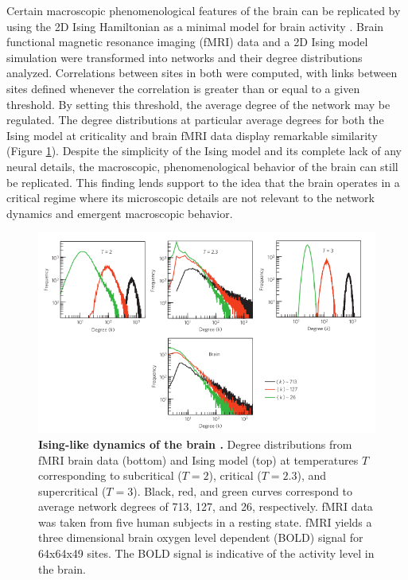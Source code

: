 \documentclass[12pt]{article}
\begin{document}
Certain macroscopic phenomenological features of the brain can be replicated by using the 2D Ising Hamiltonian as a minimal model for brain activity \cite{Fraiman2009a}. Brain functional magnetic resonance imaging (fMRI) data and a 2D Ising model simulation were transformed into networks and their degree distributions analyzed. Correlations between sites in both were computed, with links between sites defined whenever the correlation is greater than or equal to a given threshold. By setting this threshold, the average degree of the network may be regulated. The degree distributions at particular average degrees for both the Ising model at criticality and brain fMRI data display remarkable similarity (Figure \ref{Figure::Ising model and the brain at criticality}). Despite the simplicity of the Ising model and its complete lack of any neural details, the macroscopic, phenomenological behavior of the brain can still be replicated. This finding lends support to the idea that the brain operates in a critical regime where its microscopic details are not relevant to the network dynamics and emergent macroscopic behavior.

\begin{figure}      
  \begin{center}    
 \includegraphics[width=.8\textwidth]{isinglikedynamicschialvo}    
    \caption{\textbf{Ising-like dynamics of the brain \cite{Fraiman2009a}.} Degree distributions from fMRI brain data (bottom) and Ising model (top) at temperatures $T$ corresponding to subcritical ($T=2$), critical ($T=2.3$), and supercritical ($T=3$). Black, red, and green curves correspond to average network degrees of 713, 127, and 26, respectively. fMRI data was taken from five human subjects in a resting state. fMRI yields a three dimensional brain oxygen level dependent (BOLD) signal for 64x64x49 sites. The BOLD signal is indicative of the activity level in the brain.}
   \label{Figure::Ising model and the brain at criticality}   
  \end{center}     
   \end{figure}
   
\end{document}
